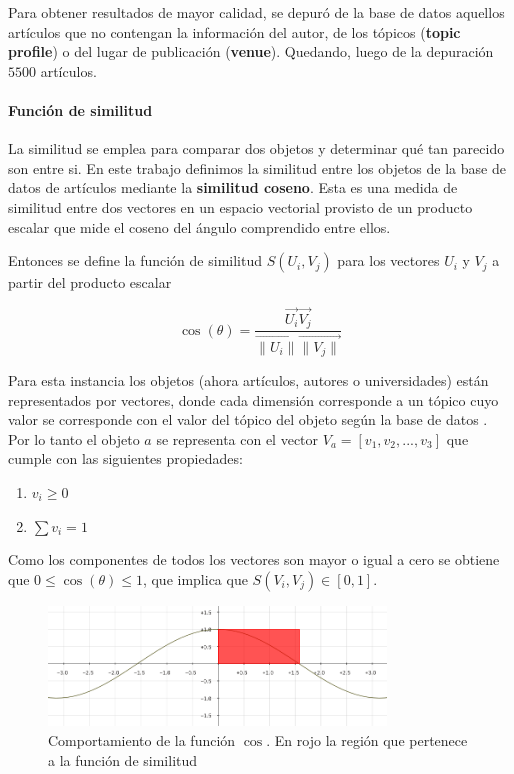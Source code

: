 Para obtener resultados de mayor calidad, se depuró de la base de datos aquellos artículos que no contengan la información del autor, de los tópicos (\textbf{topic profile}) o del lugar de publicación (\textbf{venue}). Quedando, luego de la depuración $5500$ artículos.  

\paragraph{Función de similitud}
La similitud se emplea para comparar dos objetos y determinar qué tan parecido son entre si. En este trabajo definimos la similitud entre los objetos de la base de datos de artículos mediante la \textbf{similitud coseno}. Esta es una medida de similitud entre dos vectores en un espacio vectorial provisto de un producto escalar que mide el coseno del ángulo comprendido entre ellos.

Entonces se define la función de similitud $S(U_i, V_j)$ para los vectores $U_i$ y $V_j$ a partir del producto escalar

\begin{equation} \label{eq:angulovectorial}
\cos(\theta) =  \dfrac{\overrightarrow{U_i} \overrightarrow{V_j}}{\overrightarrow{\lVert U_i\lVert} \overrightarrow{\lVert V_j\lVert}}
\end{equation}

Para esta instancia los objetos (ahora artículos, autores o universidades) están representados por vectores, donde cada dimensión corresponde a un tópico cuyo valor se corresponde con el valor del tópico del objeto según la base de datos \cite{dataDrive}. Por lo tanto el objeto $a$ se representa con el vector $V_a = [v_1,v_2,...,v_3]$ que cumple con las siguientes propiedades:
\begin{enumerate}
 \item $v_i \geq 0$
 \item $\sum{v_i} = 1$
\end{enumerate}

Como los componentes de todos los vectores son mayor o igual a cero se obtiene que $0\leq\cos(\theta)\leq1$, que implica que $S(V_i, V_j) \in \left[0, 1\right]$.

\begin{figure}[H]
\includegraphics[width=0.8\textwidth]{img/coseno.png}
\caption{Comportamiento de la función $\cos$. En rojo la región que pertenece a la función de similitud}
\label{bus:img-coseno}
\end{figure}

